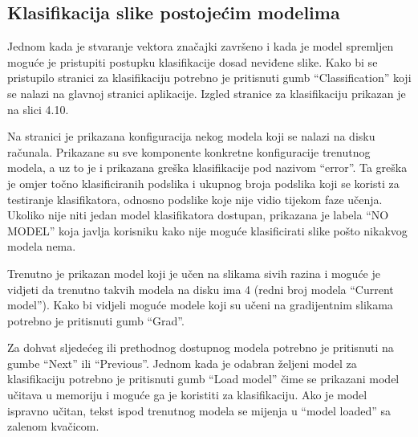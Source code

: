 \documentclass[times, utf8, zavrsni, numeric]{fer}
\begin{document}
\subsection{Klasifikacija slike postojećim modelima}

Jednom kada je stvaranje vektora značajki završeno i kada je model spremljen 
moguće je pristupiti postupku klasifikacije dosad neviđene slike. Kako bi se pristupilo 
stranici za klasifikaciju potrebno je 
pritisnuti gumb \enquote{Classification} koji se nalazi na glavnoj 
stranici aplikacije. Izgled stranice za klasifikaciju prikazan je na 
slici 4.10.

\bigbreak 

Na stranici je prikazana konfiguracija nekog modela koji se nalazi na 
disku računala. Prikazane su sve komponente konkretne konfiguracije
trenutnog modela, a uz to je i prikazana greška klasifikacije pod
nazivom \enquote{error}. Ta greška je omjer točno klasificiranih
podslika i ukupnog broja podslika koji se koristi za testiranje klasifikatora,
odnosno podslike koje nije vidio tijekom faze učenja. Ukoliko nije niti 
jedan model klasifikatora dostupan, prikazana je labela \enquote{NO MODEL}
koja javlja korisniku kako nije moguće klasificirati slike pošto nikakvog modela
nema.

\bigbreak

Trenutno je prikazan model koji je učen na slikama sivih razina i moguće
je vidjeti da trenutno takvih modela na disku ima 4 (redni broj modela
\enquote{Current model}). Kako bi vidjeli moguće modele koji su učeni na
gradijentnim slikama potrebno je pritisnuti gumb \enquote{Grad}.

\newpage

Za dohvat sljedećeg ili prethodnog dostupnog modela potrebno je pritisnuti na 
gumbe \enquote{Next} ili \enquote{Previous}. Jednom kada je odabran željeni
model za klasifikaciju potrebno je pritisnuti gumb \enquote{Load model} čime
se prikazani model učitava u memoriju i moguće ga je koristiti za klasifikaciju.
Ako je model ispravno učitan, tekst ispod trenutnog modela se mijenja
u \enquote{model loaded} sa zalenom kvačicom.

\bigbreak 
\end{document}
